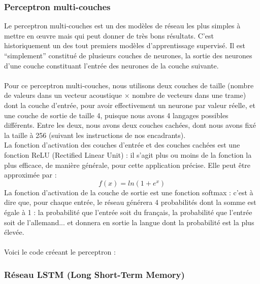 \documentclass{article}
\begin{document}
\subsubsection{Perceptron multi-couches}

Le perceptron multi-couches est un des modèles de réseau les plus simples à mettre en œuvre mais qui peut donner de très bons résultats. C'est historiquement un des tout premiers modèles d'apprentissage supervisé. Il est ``simplement'' constitué de plusieurs couches de neurones, la sortie des neurones d'une couche constituant l'entrée des neurones de la couche suivante.\\
 \\
Pour ce perceptron multi-couches, nous utilisons deux couches de taille (nombre de valeurs dans un vecteur acoustique $\times$ nombre de vecteurs dans une trame) dont la couche d'entrée, pour avoir effectivement un neurone par valeur réelle, et une couche de sortie de taille 4, puisque nous avons 4 langages possibles différents. Entre les deux, nous avons deux couches cachées, dont nous avons fixé la taille à 256 (suivant les instructions de nos encadrants).\\
La fonction d'activation des couches d'entrée et des couches cachées est une fonction ReLU (Rectified Linear Unit) : il s'agit plus ou moins de la fonction la plus efficace, de manière générale, pour cette application précise. Elle peut être approximée par :
$$ f(x) = ln(1 + e^{x}) $$
La fonction d'activation de la couche de sortie est une fonction softmax : c'est à dire que, pour chaque entrée, le réseau générera 4 probabilités dont la somme est égale à 1 : la probabilité que l'entrée soit du français, la probabilité que l'entrée soit de l'allemand... et donnera en sortie la langue dont la probabilité est la plus élevée.\\
 \\
Voici le code créeant le perceptron :\\


\subsubsection{Réseau LSTM (Long Short-Term Memory)}
\end{document}

